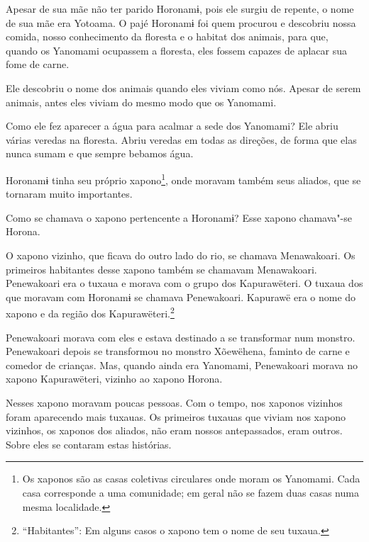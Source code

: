Apesar de sua mãe não ter parido Horonamɨ, pois ele surgiu de repente, o
nome de sua mãe era Yotoama. O pajé Horonamɨ foi quem procurou e
descobriu nossa comida, nosso conhecimento da floresta e o habitat dos
animais, para que, quando os Yanomami ocupassem a floresta, eles fossem
capazes de aplacar sua fome de carne. 

Ele descobriu o nome dos animais quando eles viviam como nós. Apesar de
serem animais, antes eles viviam do mesmo modo que os Yanomami. 

Como ele fez aparecer a água para acalmar a sede dos Yanomami? Ele abriu
várias veredas na floresta. Abriu veredas em todas as direções, de forma
que elas nunca sumam e que sempre bebamos água. 

Horonamɨ tinha seu próprio xapono\footnote{  Os xaponos são as casas coletivas circulares onde moram os Yanomami. Cada
casa corresponde a uma comunidade; em geral não se fazem duas casas numa
mesma localidade.}, onde moravam
também seus aliados, que se tornaram muito importantes. 

Como se chamava o xapono pertencente a Horonamɨ? Esse xapono chamava"-se
Horona. 

O xapono vizinho, que ficava do outro lado do rio, se chamava
Menawakoari. Os primeiros habitantes desse xapono\emph{ }também se
chamavam Menawakoari. Penewakoari era o tuxaua e morava com o grupo dos
Kapurawëteri. O tuxaua dos que moravam com Horonamɨ se chamava
Penewakoari. Kapurawë era o nome do xapono\emph{ }e da região dos
Kapurawëteri.\footnote{  ``Habitantes'': Em alguns casos o xapono tem o nome de seu tuxaua.}

Penewakoari morava com eles e estava destinado a se transformar num
monstro. Penewakoari depois se transformou no monstro Xõewëhena, faminto
de carne e comedor de crianças. Mas, quando ainda era Yanomami,
Penewakoari morava no xapono Kapurawëteri, vizinho ao
xapono\emph{ }Horona.

Nesses xapono moravam poucas pessoas. Com o tempo, nos xaponos vizinhos
foram aparecendo mais tuxauas. Os primeiros tuxauas que viviam nos
xapono\emph{ }vizinhos, os xaponos dos aliados, não eram nossos
antepassados, eram outros. Sobre eles se contaram estas histórias.